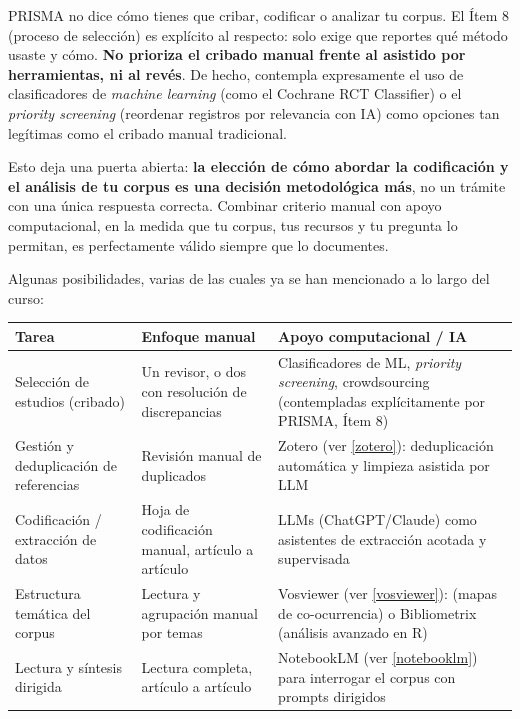 \documentclass[
]{book}
\newcounter{none} %
\begin{document}
PRISMA no dice cómo tienes que cribar, codificar o analizar tu corpus. El Ítem 8 (proceso de selección) es explícito al respecto: solo exige que reportes qué método usaste y cómo. \textbf{No prioriza el cribado manual frente al asistido por herramientas, ni al revés}. De hecho, contempla expresamente el uso de clasificadores de \emph{machine learning} (como el Cochrane RCT Classifier) o el \emph{priority screening} (reordenar registros por relevancia con IA) como opciones tan legítimas como el cribado manual tradicional.

Esto deja una puerta abierta: \textbf{la elección de cómo abordar la codificación y el análisis de tu corpus es una decisión metodológica más}, no un trámite con una única respuesta correcta. Combinar criterio manual con apoyo computacional, en la medida que tu corpus, tus recursos y tu pregunta lo permitan, es perfectamente válido siempre que lo documentes.

Algunas posibilidades, varias de las cuales ya se han mencionado a lo largo del curso:

{\def\LTcaptype{none} %
\begin{longtable}[]{@{}
  >{\raggedright\arraybackslash}p{}
  >{\raggedright\arraybackslash}p{}
  >{\raggedright\arraybackslash}p{}@{}}
\toprule\noalign{}
\begin{minipage}[b]{\linewidth}\raggedright
Tarea
\end{minipage} & \begin{minipage}[b]{\linewidth}\raggedright
Enfoque manual
\end{minipage} & \begin{minipage}[b]{\linewidth}\raggedright
Apoyo computacional / IA
\end{minipage} \\
\midrule\noalign{}
\endhead
\bottomrule\noalign{}
\endlastfoot
Selección de estudios (cribado) & Un revisor, o dos con resolución de discrepancias & Clasificadores de ML, \emph{priority screening}, crowdsourcing (contempladas explícitamente por PRISMA, Ítem 8) \\
Gestión y deduplicación de referencias & Revisión manual de duplicados & Zotero (ver \ref{zotero}): deduplicación automática y limpieza asistida por LLM \\
Codificación / extracción de datos & Hoja de codificación manual, artículo a artículo & LLMs (ChatGPT/Claude) como asistentes de extracción acotada y supervisada \\
Estructura temática del corpus & Lectura y agrupación manual por temas & Vosviewer (ver \ref{vosviewer}): (mapas de co-ocurrencia) o Bibliometrix (análisis avanzado en R) \\
Lectura y síntesis dirigida & Lectura completa, artículo a artículo & NotebookLM (ver \ref{notebooklm}) para interrogar el corpus con prompts dirigidos \\
\end{longtable}
}
\end{document}
